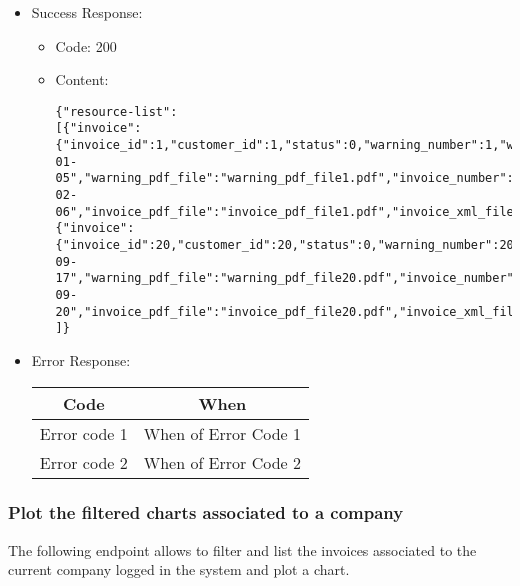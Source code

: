 \begin{itemize}
    \item Success Response: 
    \begin{itemize}
        \item Code: 200
        \item Content:
        \begin{lstlisting}
{"resource-list":
[{"invoice":{"invoice_id":1,"customer_id":1,"status":0,"warning_number":1,"warning_date":"2022-01-05","warning_pdf_file":"warning_pdf_file1.pdf","invoice_number":"1","invoice_date":"2022-02-06","invoice_pdf_file":"invoice_pdf_file1.pdf","invoice_xml_file":"invoice_xml_file1.xml","total":168.3,"discount":15.0,"pension_fund_refund":4.1,"has_stamp":false}},
{"invoice":{"invoice_id":20,"customer_id":20,"status":0,"warning_number":20,"warning_date":"2022-09-17","warning_pdf_file":"warning_pdf_file20.pdf","invoice_number":"20","invoice_date":"2022-09-20","invoice_pdf_file":"invoice_pdf_file20.pdf","invoice_xml_file":"invoice_xml_file20.xml","total":71.2,"discount":46.8,"pension_fund_refund":3.2,"has_stamp":false}}
]}
        \end{lstlisting}    
    \end{itemize}
    
    \item Error Response:
    \begin{table}[!h]
    \centering 
    \begin{tabular}{|c|c|}
    \hline
    \multicolumn{1}{|c|}{\textbf{Code}} & \multicolumn{1}{c|}{\textbf{When}} \\ \hline
    Error code 1 & When of Error Code 1 \\\hline
    Error code 2 & When of Error Code 2 \\\hline
    \end{tabular} 
    \end{table} 
    
\end{itemize}

\subsubsection*{Plot the filtered charts associated to a company}

The following endpoint allows to filter and list the invoices associated to the current company logged in the system and plot a chart.

